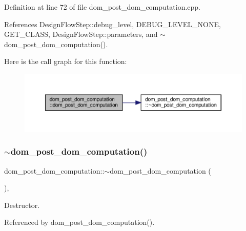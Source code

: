 Definition at line 72 of file dom\+\_\+post\+\_\+dom\+\_\+computation.\+cpp.



References Design\+Flow\+Step\+::debug\+\_\+level, D\+E\+B\+U\+G\+\_\+\+L\+E\+V\+E\+L\+\_\+\+N\+O\+NE, G\+E\+T\+\_\+\+C\+L\+A\+SS, Design\+Flow\+Step\+::parameters, and $\sim$dom\+\_\+post\+\_\+dom\+\_\+computation().

Here is the call graph for this function\+:
\nopagebreak
\begin{figure}[H]
\begin{center}
\leavevmode
\includegraphics[width=350pt]{db/d28/classdom__post__dom__computation_ab5a369e367060c93732266da7cf2f062_cgraph}
\end{center}
\end{figure}
\mbox{\label{classdom__post__dom__computation_a735e5895c025d0edc43db0e9be5c8b8c}} 
\subsubsection{\texorpdfstring{$\sim$dom\+\_\+post\+\_\+dom\+\_\+computation()}{~dom\_post\_dom\_computation()}}
{\footnotesize\ttfamily dom\+\_\+post\+\_\+dom\+\_\+computation\+::$\sim$dom\+\_\+post\+\_\+dom\+\_\+computation (\begin{DoxyParamCaption}{ }\end{DoxyParamCaption})\hspace{0.3cm}{\ttfamily [override]}, {\ttfamily [default]}}



Destructor. 



Referenced by dom\+\_\+post\+\_\+dom\+\_\+computation().

